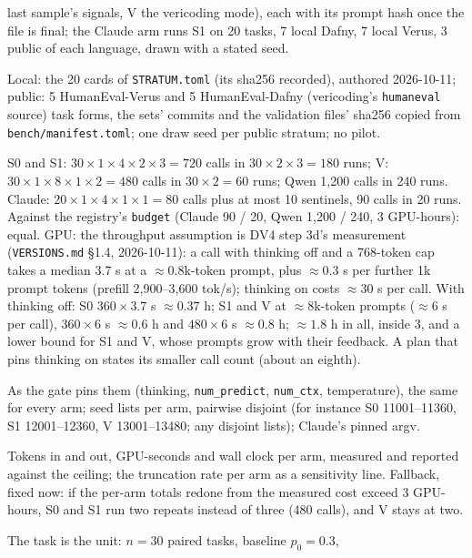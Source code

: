 \documentclass[11pt]{article}
\begin{document}
\begin{description}
  last sample's signals, V the vericoding mode), each with its prompt hash once
  the file is final; the Claude arm runs S1 on 20 tasks, 7 local Dafny, 7
  local Verus, 3 public of each language, drawn with a stated seed.
\item[Tasks and strata.] Local: the 20 cards of \texttt{STRATUM.toml} (its
  sha256 recorded), authored 2026-10-11; public: 5 HumanEval-Verus and 5
  HumanEval-Dafny (vericoding's \texttt{humaneval} source) task forms, the
  sets' commits and the validation files' sha256 copied from
  \texttt{bench/manifest.toml}; one draw seed per public stratum; no pilot.
\item[Budget arithmetic.] S0 and S1: $30 \times 1 \times 4 \times 2 \times 3
  = 720$ calls in $30 \times 2 \times 3 = 180$ runs; V: $30 \times 1 \times 8
  \times 1 \times 2 = 480$ calls in $30 \times 2 = 60$ runs; Qwen 1,200 calls
  in 240 runs. Claude: $20 \times 1 \times 4 \times 1 \times 1 = 80$ calls plus
  at most 10 sentinels, 90 calls in 20 runs. Against the registry's
  \texttt{budget} (Claude 90 / 20, Qwen 1,200 / 240, 3 GPU-hours): equal. GPU:
  the throughput assumption is DV4 step 3d's measurement (\texttt{VERSIONS.md}
  \S1.4, 2026-10-11): a call with thinking off and a 768-token cap takes a
  median 3.7 s at a $\approx 0.8$k-token prompt, plus $\approx 0.3$ s per
  further 1k prompt tokens (prefill 2,900--3,600 tok/s); thinking on costs
  $\approx 30$ s per call. With thinking off: S0 $360 \times 3.7$ s $\approx
  0.37$ h; S1 and V at $\approx 8$k-token prompts ($\approx 6$ s per call),
  $360 \times 6$ s $\approx 0.6$ h and $480 \times 6$ s $\approx 0.8$ h;
  $\approx 1.8$ h in all, inside 3, and a lower bound for S1 and V, whose
  prompts grow with their feedback. A plan that pins thinking on states its
  smaller call count (about an eighth).
\item[Generation settings.] As the gate pins them (thinking, \texttt{num\_predict},
  \texttt{num\_ctx}, temperature), the same for every arm; seed lists per arm,
  pairwise disjoint (for instance S0 11001--11360, S1 12001--12360, V
  13001--13480; any disjoint lists); Claude's pinned argv.
\item[Cost per arm.] Tokens in and out, GPU-seconds and wall clock per arm,
  measured and reported against the ceiling; the truncation rate per arm as a
  sensitivity line. Fallback, fixed now: if the per-arm totals redone from the
  measured cost exceed 3 GPU-hours, S0 and S1 run two repeats instead of
  three (480 calls), and V stays at two.
\item[MDE.] The task is the unit: $n = 30$ paired tasks, baseline $p_0 = 0.3$,

\end{description}
\end{document}
